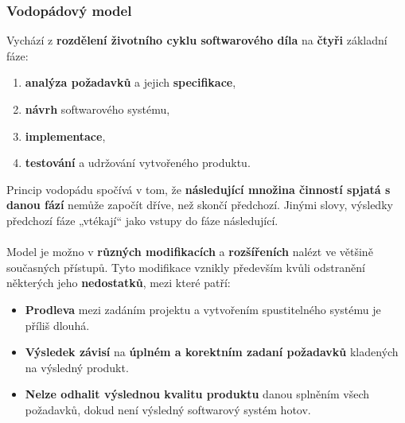 \subsubsection{Vodopádový model}
Vychází z \textbf{rozdělení životního cyklu softwarového díla} na \textbf{čtyři} základní fáze:
\begin{enumerate}
\item \textbf{analýza požadavků} a jejich \textbf{specifikace},
\item \textbf{návrh} softwarového systému,
\item \textbf{implementace},
\item \textbf{testování} a udržování vytvořeného produktu.
\end{enumerate}
Princip vodopádu spočívá v tom, že \textbf{následující množina činností spjatá s danou fází} nemůže započít dříve, než skončí předchozí. Jinými slovy, výsledky předchozí fáze „vtékají“ jako vstupy do fáze následující.
\\\\
\noindent{}
Model je možno v \textbf{různých modifikacích} a \textbf{rozšířeních} nalézt ve většině současných přístupů. Tyto modifikace vznikly především kvůli odstranění některých jeho \textbf{nedostatků}, mezi které patří:
\begin{itemize}
\item \textbf{Prodleva} mezi zadáním projektu a vytvořením spustitelného systému je příliš dlouhá.
\item \textbf{Výsledek závisí} na \textbf{úplném a korektním zadaní požadavků} kladených na výsledný produkt.
\item \textbf{Nelze odhalit výslednou kvalitu produktu} danou splněním všech požadavků, dokud není výsledný softwarový systém hotov.
\end{itemize}

